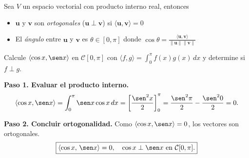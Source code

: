 \begin{definition}
Sea $V$ un espacio vectorial con producto interno real, entonces 
\begin{itemize}
    \item $\mathbf{u}$ y $\mathbf{v}$ son \textit{ortogonales} ($\mathbf{u} \perp \mathbf{v}$) si $\langle \mathbf{u}, \mathbf{v} \rangle = 0$
    \item El \textit{ángulo} entre $\mathbf{u}$ y $\mathbf{v}$ es $\theta \in [0, \pi]$ donde \(
    \cos \theta = \frac{\langle \mathbf{u}, \mathbf{v} \rangle}{\|\mathbf{u}\| \|\mathbf{v}\|}\)
\end{itemize}
\end{definition}

\begin{example}
Calcule $\langle \cos x, \sen x \rangle$ en $\mathcal{C}[0, \pi]$ con $\langle f, g \rangle = \int_0^\pi f(x)g(x)\,dx$ y determine si $f \perp g$.
\begin{myproof}
\textbf{Paso 1. Evaluar el producto interno.}
\[
\langle \cos x, \sen x \rangle = \int_0^\pi \sen x \cos x\,dx = \left[ \frac{\sen^2 x}{2} \right]_0^\pi = \frac{\sen^2 \pi}{2} - \frac{\sen^2 0}{2} = 0.
\]

\textbf{Paso 2. Concluir ortogonalidad.} Como $\langle \cos x, \sen x \rangle = 0$, los vectores son ortogonales.
$$\boxed{\langle \cos x,\, \sen x \rangle = 0,\quad \cos x \perp \sen x \text{ en } \mathcal{C}[0,\pi].}$$
\end{myproof}
\end{example}


